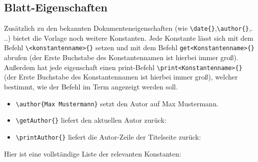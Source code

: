 \documentclass[
    titleprefix=AlgoTeX,
    inlineshortcut=java,
    corporatedesign,
    boxarc,
]{algoexercise}
\renewcommand*{\author}[1]{
    \seq_gset_split:Nnn \g_ptxcd_author_seq {\and} {#1}
    \seq_if_empty:NF \g_ptxcd_author_seq {\tl_gset:Nn \printAuthor {\int_compare:nTF{\seq_count:N \g_ptxcd_author_seq >
                1}{Autoren}{Autor}:~\hfill\seq_use:Nnnn \g_ptxcd_author_seq {~\authorandname{}~} {,~} {~\authorandname{}~}\par}}
}
\begin{document}
    \subsection{Blatt-Eigenschaften}\label{sheet-properties}
    Zusätzlich zu den bekannten Dokumenteneigenschaften (wie \verb+\date{}+,\verb+\author{}+,.
    ..) bietet die Vorlage noch weitere
    Konstanten.
    Jede Konstante lässt sich mit dem Befehl \verb+\<konstantenname>{}+ setzen und mit dem Befehl \verb+get<Konstantenname>{}+
    abrufen (der Erste Buchstabe des Konstantennamen ist hierbei immer groß).
    Außerdem hat jede eigenschaft einen print-Befehl \verb+\print<Konstantenname>{}+ (der Erste Buchstabe des Konstantennamen ist
    hierbei immer groß), welcher bestimmt, wie der Befehl im Term angezeigt werden soll.
    \begin{beispiel}
        \begin{itemize}
            \item \verb+\author{Max Mustermann}+ setzt den Autor auf Max Mustermann.
            \item \verb+\getAuthor{}+ liefert den aktuellen Autor zurück: \getAuthor{}
            \item \verb+\printAuthor{}+ liefert die Autor-Zeile der Titelseite zurück:\par\printAuthor{}
        \end{itemize}
    \end{beispiel}
    Hier ist eine vollständige Liste der relevanten Konstanten:
\end{document}
